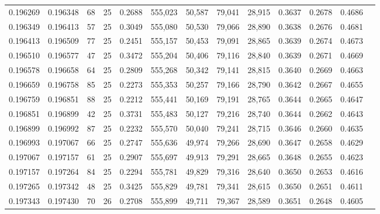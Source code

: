\begin{tabular}{rrrrrrrrrrrrr}
0.196269 & 0.196348 &    68 &  25 &                                     0.2688 & 555,023 &  50,587 &  79,041 &  28,915 & 0.3637 & 0.2678 & 0.4686 \\
0.196349 & 0.196413 &    57 &  25 &                                     0.3049 & 555,080 &  50,530 &  79,066 &  28,890 & 0.3638 & 0.2676 & 0.4681 \\
0.196413 & 0.196509 &    77 &  25 &                                     0.2451 & 555,157 &  50,453 &  79,091 &  28,865 & 0.3639 & 0.2674 & 0.4673 \\
0.196510 & 0.196577 &    47 &  25 &                                     0.3472 & 555,204 &  50,406 &  79,116 &  28,840 & 0.3639 & 0.2671 & 0.4669 \\
0.196578 & 0.196658 &    64 &  25 &                                     0.2809 & 555,268 &  50,342 &  79,141 &  28,815 & 0.3640 & 0.2669 & 0.4663 \\
0.196659 & 0.196758 &    85 &  25 &                                     0.2273 & 555,353 &  50,257 &  79,166 &  28,790 & 0.3642 & 0.2667 & 0.4655 \\
0.196759 & 0.196851 &    88 &  25 &                                     0.2212 & 555,441 &  50,169 &  79,191 &  28,765 & 0.3644 & 0.2665 & 0.4647 \\
0.196851 & 0.196899 &    42 &  25 &                                     0.3731 & 555,483 &  50,127 &  79,216 &  28,740 & 0.3644 & 0.2662 & 0.4643 \\
0.196899 & 0.196992 &    87 &  25 &                                     0.2232 & 555,570 &  50,040 &  79,241 &  28,715 & 0.3646 & 0.2660 & 0.4635 \\
0.196993 & 0.197067 &    66 &  25 &                                     0.2747 & 555,636 &  49,974 &  79,266 &  28,690 & 0.3647 & 0.2658 & 0.4629 \\
0.197067 & 0.197157 &    61 &  25 &                                     0.2907 & 555,697 &  49,913 &  79,291 &  28,665 & 0.3648 & 0.2655 & 0.4623 \\
0.197157 & 0.197264 &    84 &  25 &                                     0.2294 & 555,781 &  49,829 &  79,316 &  28,640 & 0.3650 & 0.2653 & 0.4616 \\
0.197265 & 0.197342 &    48 &  25 &                                     0.3425 & 555,829 &  49,781 &  79,341 &  28,615 & 0.3650 & 0.2651 & 0.4611 \\
0.197343 & 0.197430 &    70 &  26 &                                     0.2708 & 555,899 &  49,711 &  79,367 &  28,589 & 0.3651 & 0.2648 & 0.4605 \\

\end{tabular}
